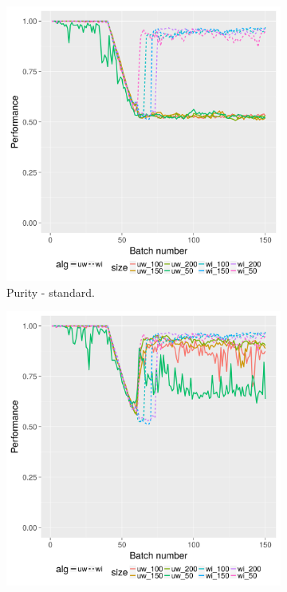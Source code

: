 \begin{figure}[H]
        \centering
        \begin{subfigure}[b]{0.47\textwidth}
          \includegraphics[width=\textwidth]{standard_alt/evolving_pen_48_49_standard_purity.png}         
                 \caption{Purity - standard.}
                 \label{fig:ps_4849}
        \end{subfigure}
        \begin{subfigure}[b]{0.47\textwidth}
                 \includegraphics[width=\textwidth]{standard_alt/evolving_pen_48_49_alternative_purity.png}

\end{subfigure}
\end{figure}
